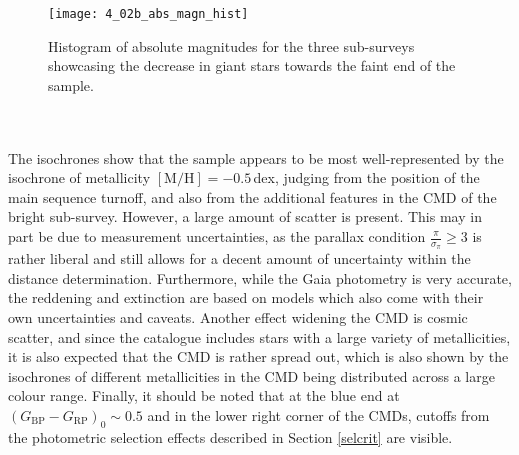 \documentclass[a4paper,11pt]{article}
\begin{document}
%
\begin{figure}
 \centering
 \texttt{[image: 4\_02b\_abs\_magn\_hist]}
 \caption[Histogram of absolute magnitudes for three sub-surveys]{Histogram of absolute magnitudes for the three sub-surveys showcasing the decrease in giant stars towards the faint end of the sample.}
 \label{fig:abs_magn_hist}
\end{figure}\\ \\
%
The isochrones show that the sample appears to be most well-represented by the isochrone of metallicity $\mathrm{[M/H]}=-0.5$\,dex, judging from the position of the main sequence turnoff, and also from the additional features in the CMD of the bright sub-survey. However, a large amount of scatter is present. This may in part be due to measurement uncertainties, as the parallax condition $\frac{\pi}{\sigma_\pi}\geq3$ is rather liberal and still allows for a decent amount of uncertainty within the distance determination. Furthermore, while the Gaia photometry is very accurate, the reddening and extinction are based on models which also come with their own uncertainties and caveats. Another effect widening the CMD is cosmic scatter, and since the catalogue includes stars with a large variety of metallicities, it is also expected that the CMD is rather spread out, which is also shown by the isochrones of different metallicities in the CMD being distributed across a large colour range. Finally, it should be noted that at the blue end at $(G_\mathrm{BP}-G_\mathrm{RP})_0\sim0.5$ and in the lower right corner of the CMDs, cutoffs from the photometric selection effects described in Section \ref{selcrit} are visible.
%
\end{document}
